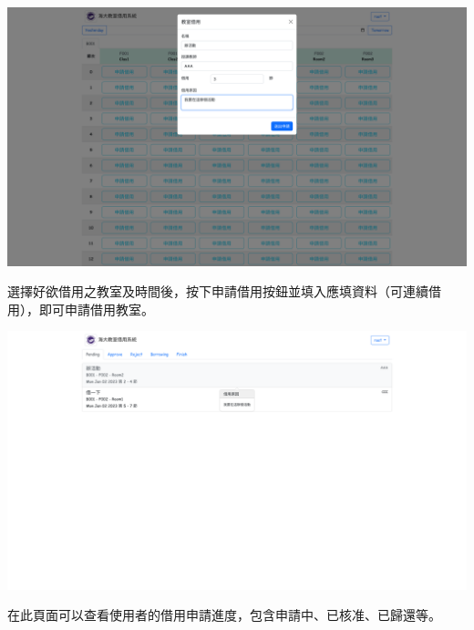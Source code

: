 \documentclass{article}
\begin{document}
\pagebreak

\begin{center}
	\includegraphics[width=\linewidth]{PendingApplication.png}
\end{center}

選擇好欲借用之教室及時間後，按下申請借用按鈕並填入應填資料（可連續借用），即可申請借用教室。

\pagebreak

\begin{center}
	\includegraphics[width=\linewidth]{ApplicationsList.png}
\end{center}

在此頁面可以查看使用者的借用申請進度，包含申請中、已核准、已歸還等。

\pagebreak
\end{document}
